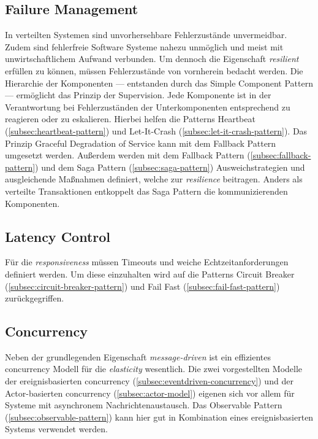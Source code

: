 \subsection{Failure Management}
In verteilten Systemen sind unvorhersehbare Fehlerzustände unvermeidbar. Zudem sind fehlerfreie Software Systeme nahezu unmöglich und meist mit unwirtschaftlichem Aufwand verbunden. Um dennoch die Eigenschaft \textit{resilient} erfüllen zu können, müssen Fehlerzustände von vornherein bedacht werden. Die Hierarchie der Komponenten --- entstanden durch das Simple Component Pattern --- ermöglicht das Prinzip der Supervision. Jede Komponente ist in der Verantwortung bei Fehlerzuständen der Unterkomponenten entsprechend zu reagieren oder zu eskalieren. Hierbei helfen die Patterns Heartbeat (\ref{subsec:heartbeat-pattern}) und Let-It-Crash (\ref{subsec:let-it-crash-pattern}). Das Prinzip Graceful Degradation of Service kann mit dem Fallback Pattern umgesetzt werden. Außerdem werden mit dem Fallback Pattern (\ref{subsec:fallback-pattern}) und dem Saga Pattern (\ref{subsec:saga-pattern}) Ausweichstrategien und ausgleichende Maßnahmen definiert, welche zur \textit{resilience} beitragen. Anders als verteilte Transaktionen entkoppelt das Saga Pattern die kommunizierenden Komponenten.

\subsection{Latency Control}
Für die \textit{responsiveness} müssen Timeouts und weiche Echtzeitanforderungen definiert werden. Um diese einzuhalten wird auf die Patterns Circuit Breaker (\ref{subsec:circuit-breaker-pattern}) und Fail Fast (\ref{subsec:fail-fast-pattern}) zurückgegriffen. 

\subsection{Concurrency}
Neben der grundlegenden Eigenschaft \textit{message-driven} ist ein effizientes \gls{concurrency} Modell für die \textit{elasticity} wesentlich. Die zwei vorgestellten Modelle der ereignisbasierten \gls{concurrency} (\ref{subsec:eventdriven-concurrency}) und der Actor-basierten \gls{concurrency} (\ref{subsec:actor-model}) eigenen sich vor allem für Systeme mit asynchronem Nachrichtenaustausch. Das Observable Pattern (\ref{subsec:observable-pattern}) kann hier gut in Kombination eines ereignisbasierten Systems verwendet werden.

\pagebreak

